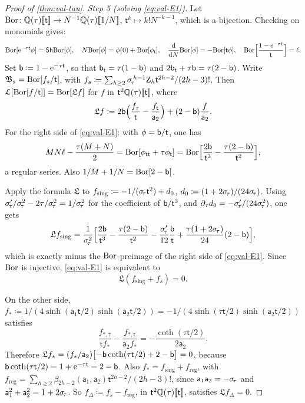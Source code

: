 \begin{proof}[Proof of \cref{thm:val-tau}]
\emph{Step 5 (solving \eqref{eq:val-E1}).} Let $\mathrm{Bor}\colon\mathbb{Q}(\tau)[\![ \mathsf{t} ]\!]\to N^{-1}\mathbb{Q}(\tau)[\![ 1/N ]\!]$, $\mathsf{t}^k\mapsto k!N^{-k-1}$, which is a bijection. Checking on monomials gives:
\[
\mathrm{Bor}[\mathrm{e}^{-\tau\mathsf{t}}\phi]=\mathsf{Sh}\mathrm{Bor}[\phi],\quad N\mathrm{Bor}[\phi]=\phi(0)+\mathrm{Bor}[\phi_{\mathsf{t}}],\quad\frac{\mathrm{d}}{\mathrm{d} N}\mathrm{Bor}[\phi]=-\mathrm{Bor}[\mathsf{t}\phi],\quad\mathrm{Bor}\Bigl[\frac{1-\mathrm{e}^{-\tau\mathsf{t}}}{\mathsf{t}}\Bigr]=\ell.
\]
Set $\mathsf{b}\coloneqq1-\mathrm{e}^{-\tau\mathsf{t}}$, so that $\mathsf{b}_{\mathsf{t}}=\tau(1-\mathsf{b})$ and $2\mathsf{b}_{\mathsf{t}}+\tau\mathsf{b}=\tau(2-\mathsf{b})$. Write $\mathfrak{B}_s=\mathrm{Bor}[f_s/\mathsf{t}]$, with $f_s\coloneqq\sum_{h\geq 2}\sigma_{\!\tau}^{\,h-1}\mathrm{Z}_h\mathsf{t}^{2h-2}/(2h-3)!$. Then $\mathcal{L}[\mathrm{Bor}[f/\mathsf{t}]]=\mathrm{Bor}[\mathfrak{L}f]$ for $f$ in $\mathsf{t}^2\mathbb{Q}(\tau)[\![ \mathsf{t} ]\!]$, where
\[
\mathfrak{L}f\coloneqq2\mathsf{b}\Bigl(\frac{f_\tau}{\mathsf{t}}-\frac{f_{\mathsf{t}}}{\mathsf{a}_2}\Bigr)+(2-\mathsf{b})\frac{f}{\mathsf{a}_2}.
\]
For the right side of \eqref{eq:val-E1}: with $\phi=\mathsf{b}/\mathsf{t}$, one has
\[
MN\ell-\frac{\tau(M+N)}{2}=\mathrm{Bor}[\phi_{\mathsf{t}\mathsf{t}}+\tau\phi_{\mathsf{t}}]=\mathrm{Bor}\Bigl[\frac{2\mathsf{b}}{\mathsf{t}^3}-\frac{\tau(2-\mathsf{b})}{\mathsf{t}^2}\Bigr],
\]
a regular series. Also $1/M+1/N=\mathrm{Bor}[2-\mathsf{b}]$.

Apply the formula $\mathfrak{L}$ to $f_{\mathrm{sing}}\coloneqq-1/(\sigma_{\!\tau}\mathsf{t}^2)+d_0$, $d_0\coloneqq(1+2\sigma_{\!\tau})/(24\sigma_{\!\tau})$. Using $\sigma_{\!\tau}'/\sigma_{\!\tau}^2-2\tau/\sigma_{\!\tau}^2=1/\sigma_{\!\tau}^2$ for the coefficient of $\mathsf{b}/\mathsf{t}^3$, and $\partial_\tau d_0=-\sigma_{\!\tau}'/(24\sigma_{\!\tau}^2)$, one gets
\[
\mathfrak{L}f_{\mathrm{sing}}=\frac{1}{\sigma_{\!\tau}^2}\Bigl[\frac{2\mathsf{b}}{\mathsf{t}^3}-\frac{\tau(2-\mathsf{b})}{\mathsf{t}^2}-\frac{\sigma_{\!\tau}'}{12}\frac{\mathsf{b}}{\mathsf{t}}+\frac{\tau(1+2\sigma_{\!\tau})}{24}(2-\mathsf{b})\Bigr],
\]
which is exactly minus the $\mathrm{Bor}$-preimage of the right side of \eqref{eq:val-E1}. Since $\mathrm{Bor}$ is injective, \eqref{eq:val-E1} is equivalent to
\[
\mathfrak{L}(f_{\mathrm{sing}}+f_s)=0.
\]

On the other side, $f_*\coloneqq1/(4\sinh(\mathsf{a}_1\mathsf{t}/2)\sinh(\mathsf{a}_2\mathsf{t}/2))=-1/(4\sinh(\tau\mathsf{t}/2)\sinh(\mathsf{a}_2\mathsf{t}/2))$ satisfies
\[
\frac{f_{*,\tau}}{\mathsf{t}f_*}-\frac{f_{*,\mathsf{t}}}{\mathsf{a}_2f_*}=-\frac{\coth(\tau\mathsf{t}/2)}{2\mathsf{a}_2}.
\]
Therefore $\mathfrak{L}f_*=(f_*/\mathsf{a}_2)\bigl[-\mathsf{b}\coth(\tau\mathsf{t}/2)+2-\mathsf{b}\bigr]=0$, because $\mathsf{b}\coth(\tau\mathsf{t}/2)=1+\mathrm{e}^{-\tau\mathsf{t}}=2-\mathsf{b}$. Also $f_*=f_{\mathrm{sing}}+f_{\mathrm{reg}}$, with $f_{\mathrm{reg}}=\sum_{h\geq 2}\beta_{2h-2}(\mathsf{a}_1,\mathsf{a}_2)\mathsf{t}^{2h-2}/(2h-3)!$, since $\mathsf{a}_1\mathsf{a}_2=-\sigma_{\!\tau}$ and $\mathsf{a}_1^2+\mathsf{a}_2^2=1+2\sigma_{\!\tau}$. So $f_{\Delta}\coloneqq f_s-f_{\mathrm{reg}}$, in $\mathsf{t}^2\mathbb{Q}(\tau)[\![ \mathsf{t} ]\!]$, satisfies $\mathfrak{L}f_{\Delta}=0$.


\end{proof}
